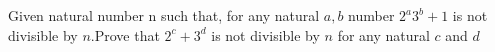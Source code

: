 \begin{problem}
    Given natural number n such that, for any natural $a,b$ number $2^a3^b+1$ is not divisible by $n$.Prove that $2^c+3^d$ is not divisible by $n$ for any natural $c$ and $d$

    \label{20IZHO1}
\end{problem}